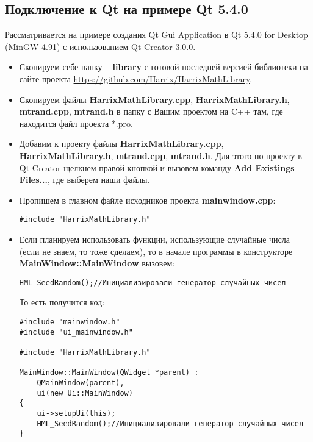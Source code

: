 \subsection{Подключение к Qt на примере Qt 5.4.0}

Рассматривается на примере создания Qt Gui Application в Qt 5.4.0 for Desktop (MinGW 4.91) с использованием Qt Creator 3.0.0.

\begin{itemize}
\item Скопируем себе папку \textbf{\_library} с готовой последней версией библиотеки на сайте проекта \href{https://github.com/Harrix/HarrixMathLibrary}{https://github.com/Harrix/HarrixMathLibrary}.

\item Скопируем файлы \textbf{HarrixMathLibrary.cpp}, \textbf{HarrixMathLibrary.h}, \textbf{mtrand.cpp}, \textbf{mtrand.h} в папку с Вашим проектом на C++ там, где находится файл проекта *.pro.

\item Добавим к проекту файлы \textbf{HarrixMathLibrary.cpp}, \textbf{HarrixMathLibrary.h}, \textbf{mtrand.cpp}, \textbf{mtrand.h}. Для этого по проекту в Qt Creator щелкнем правой кнопкой и вызовем команду \textbf{Add Existings Files...}, где выберем наши файлы.

\item Пропишем в главном файле исходников проекта \textbf{mainwindow.cpp}:
\begin{lstlisting}[label=install_01_qt,caption=Подключение библиотеки]
#include "HarrixMathLibrary.h"
\end{lstlisting}

\item Если планируем использовать функции, использующие случайные числа (если не знаем, то тоже сделаем), то в начале программы в конструкторе \textbf{MainWindow::MainWindow} вызовем:
\begin{lstlisting}[label=install_02_qt,caption=Инициализация генератора случайных чисел]
HML_SeedRandom();//Инициализировали генератор случайных чисел
\end{lstlisting}

То есть получится код:
\begin{lstlisting}[label=install_03_qt,caption=Пример файла mainwindow.cpp с подключенной библиотекой]
#include "mainwindow.h"
#include "ui_mainwindow.h"

#include "HarrixMathLibrary.h"

MainWindow::MainWindow(QWidget *parent) :
    QMainWindow(parent),
    ui(new Ui::MainWindow)
{
    ui->setupUi(this);
    HML_SeedRandom();//Инициализировали генератор случайных чисел    
}


\end{lstlisting}
\end{itemize}
